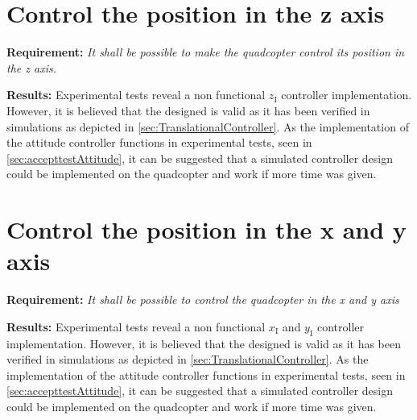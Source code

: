 \newpage

\section{Control the position in the z axis}
\textbf{Requirement:}
\textit{It shall be possible to make the quadcopter control its position in the z axis.}

\textbf{Results:}
Experimental tests reveal a non functional $z_{\mathrm{I}}$ controller implementation. However, it is believed that the designed is valid as it has been verified in simulations as depicted in \autoref{sec:TranslationalController}. As the implementation of the attitude controller functions in experimental tests, seen in \autoref{sec:accepttestAttitude}, it can be suggested that a simulated controller design could be implemented on the quadcopter and work if more time was given.





\newpage

\section{Control the position in the x and y axis}
\textbf{Requirement:}
\textit{It shall be possible to control the quadcopter in the x and y axis}

\textbf{Results:}
Experimental tests reveal a non functional $x_{\mathrm{I}}$ and $y_{\mathrm{I}}$ controller implementation. However, it is believed that the designed is valid as it has been verified in simulations as depicted in \autoref{sec:TranslationalController}. As the implementation of the attitude controller functions in experimental tests, seen in \autoref{sec:accepttestAttitude}, it can be suggested that a simulated controller design could be implemented on the quadcopter and work if more time was given.


\newpage
